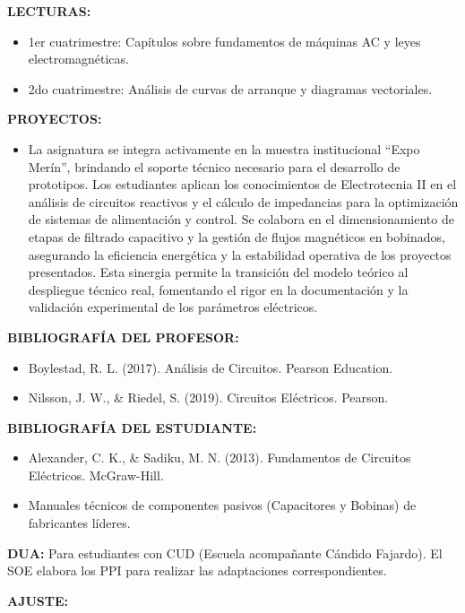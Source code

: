 \documentclass[a4paper,12pt]{article}
\begin{document}
\raggedright
\textbf{LECTURAS:}

\begin{itemize}[leftmargin=*, nosep]
  \item 1er cuatrimestre: Capítulos sobre fundamentos de máquinas AC
    y leyes electromagnéticas.
  \item 2do cuatrimestre: Análisis de curvas de arranque y diagramas
    vectoriales.
\end{itemize}

\textbf{PROYECTOS:}

\begin{itemize}[leftmargin=*, nosep]
  \item La asignatura se integra activamente en la muestra
    institucional ``Expo Merín'', brindando el soporte técnico
    necesario para el desarrollo de prototipos. Los estudiantes
    aplican los conocimientos de Electrotecnia II en el análisis de
    circuitos reactivos y el cálculo de impedancias para la
    optimización de sistemas de alimentación y control. Se colabora
    en el dimensionamiento de etapas de filtrado capacitivo y la
    gestión de flujos magnéticos en bobinados, asegurando la
    eficiencia energética y la estabilidad operativa de los proyectos
    presentados. Esta sinergia permite la transición del modelo
    teórico al despliegue técnico real, fomentando el rigor en la
    documentación y la validación experimental de los parámetros eléctricos.
\end{itemize}

\textbf{BIBLIOGRAFÍA DEL PROFESOR:}

\begin{itemize}[leftmargin=*, nosep]
  \item Boylestad, R. L. (2017). Análisis de Circuitos. Pearson Education.
  \item Nilsson, J. W., \& Riedel, S. (2019). Circuitos Eléctricos. Pearson.
\end{itemize}

\textbf{BIBLIOGRAFÍA DEL ESTUDIANTE:}

\begin{itemize}[leftmargin=*, nosep]
  \item Alexander, C. K., \& Sadiku, M. N. (2013). Fundamentos de
    Circuitos Eléctricos. McGraw-Hill.
  \item Manuales técnicos de componentes pasivos (Capacitores y
    Bobinas) de fabricantes líderes.
\end{itemize}

\textbf{DUA:} Para estudiantes con CUD (Escuela acompañante Cándido
Fajardo). El SOE elabora los PPI para realizar las adaptaciones
correspondientes.

\textbf{AJUSTE:}

\noindent\makebox[\linewidth]{\dotfill}
\end{document}
